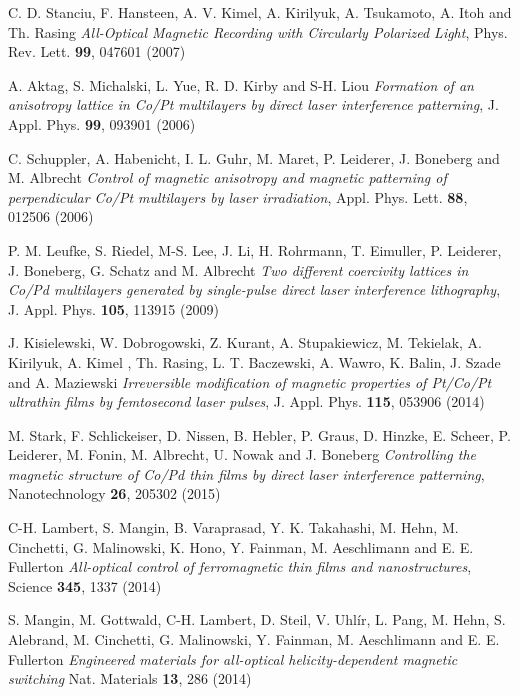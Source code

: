\documentclass[5p]{elsarticle}
\begin{document}
\begin{thebibliography}{}
C. D. Stanciu, F. Hansteen, A. V. Kimel, A. Kirilyuk, A. Tsukamoto, A. Itoh and Th. Rasing \emph{All-Optical Magnetic Recording with Circularly Polarized Light}, Phys. Rev. Lett. \textbf{99}, 047601 (2007)

A. Aktag, S. Michalski, L. Yue, R. D. Kirby and S-H. Liou \emph{Formation of an anisotropy lattice in Co/Pt multilayers by direct laser interference patterning}, J. Appl. Phys. \textbf{99}, 093901 (2006)

C. Schuppler, A. Habenicht, I. L. Guhr, M. Maret, P. Leiderer, J. Boneberg and M. Albrecht \emph{Control of magnetic anisotropy and magnetic patterning of perpendicular Co/Pt multilayers by laser irradiation}, Appl. Phys. Lett. \textbf{88}, 012506 (2006)

P. M. Leufke, S. Riedel, M-S. Lee, J. Li, H. Rohrmann, T. Eimuller, P. Leiderer, J. Boneberg, G. Schatz and M. Albrecht \emph{Two different coercivity lattices in Co/Pd multilayers generated by single-pulse direct laser interference lithography}, J. Appl. Phys. \textbf{105}, 113915 (2009)

J. Kisielewski, W. Dobrogowski, Z. Kurant, A. Stupakiewicz, M. Tekielak, A. Kirilyuk, A. Kimel , Th. Rasing, L. T. Baczewski, A. Wawro, K. Balin, J. Szade and A. Maziewski \emph{Irreversible modification of magnetic properties of Pt/Co/Pt ultrathin films by femtosecond laser pulses}, J. Appl. Phys. \textbf{115}, 053906 (2014)

M. Stark, F. Schlickeiser, D. Nissen, B. Hebler, P. Graus, D. Hinzke, E. Scheer, P. Leiderer, M. Fonin, M. Albrecht, U. Nowak and J. Boneberg \emph{Controlling the magnetic structure of Co/Pd thin films by direct laser interference patterning}, Nanotechnology \textbf{26}, 205302 (2015)

C-H. Lambert, S. Mangin, B. Varaprasad, Y. K. Takahashi, M. Hehn, M. Cinchetti, G. Malinowski, K. Hono, Y. Fainman, M. Aeschlimann and E. E. Fullerton \emph{All-optical control of ferromagnetic thin films and nanostructures}, Science \textbf{345}, 1337 (2014)

S. Mangin, M. Gottwald, C-H. Lambert, D. Steil, V. Uhlír, L. Pang, M. Hehn, S. Alebrand, M. Cinchetti, G. Malinowski, Y. Fainman, M. Aeschlimann and E. E. Fullerton \emph{Engineered materials for all-optical helicity-dependent magnetic switching} Nat. Materials \textbf{13}, 286 (2014)


\end{thebibliography}
\end{document}
